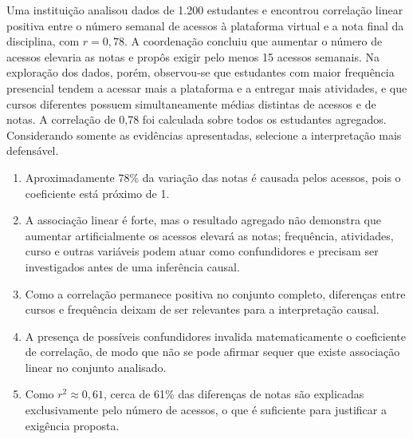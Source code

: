 \documentclass[12pt,a4paper]{article}
\begin{document}
\TextoBase
Uma instituição analisou dados de 1.200 estudantes e encontrou correlação linear positiva entre o número semanal de acessos à plataforma virtual e a nota final da disciplina, com $r=0{,}78$. A coordenação concluiu que aumentar o número de acessos elevaria as notas e propôs exigir pelo menos 15 acessos semanais. Na exploração dos dados, porém, observou-se que estudantes com maior frequência presencial tendem a acessar mais a plataforma e a entregar mais atividades, e que cursos diferentes possuem simultaneamente médias distintas de acessos e de notas. A correlação de 0,78 foi calculada sobre todos os estudantes agregados.
\FonteDidatica
\Comando Considerando somente as evidências apresentadas, selecione a interpretação mais defensável.
\begin{enumerate}[label=\Alph*)]
\item Aproximadamente 78\% da variação das notas é causada pelos acessos, pois o coeficiente está próximo de 1.
\item A associação linear é forte, mas o resultado agregado não demonstra que aumentar artificialmente os acessos elevará as notas; frequência, atividades, curso e outras variáveis podem atuar como confundidores e precisam ser investigados antes de uma inferência causal.
\item Como a correlação permanece positiva no conjunto completo, diferenças entre cursos e frequência deixam de ser relevantes para a interpretação causal.
\item A presença de possíveis confundidores invalida matematicamente o coeficiente de correlação, de modo que não se pode afirmar sequer que existe associação linear no conjunto analisado.
\item Como $r^2\approx0{,}61$, cerca de 61\% das diferenças de notas são explicadas exclusivamente pelo número de acessos, o que é suficiente para justificar a exigência proposta.
\end{enumerate}
\end{document}
